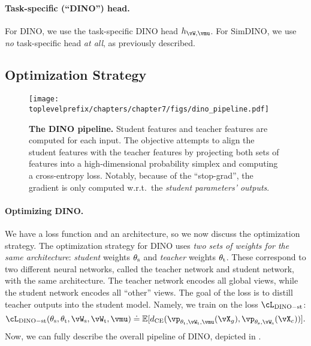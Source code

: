 \documentclass[../../book-main.tex]{subfiles}
\begin{document}
\paragraph{Task-specific (``DINO'') head.} For DINO, we use the task-specific DINO head \(h_{\vW, \vmu}\). For SimDINO, we use \textit{no} task-specific head \textit{at all}, as previously described.

\subsection{Optimization Strategy}\label{sub:contrastive_learning_optimization}

\begin{figure}
    \centering 
    \texttt{[image: \\toplevelprefix/chapters/chapter7/figs/dino\_pipeline.pdf]}
    \caption{\small \textbf{The DINO pipeline.} Student features and teacher features are computed for each input. The objective attempts to align the student features with the teacher features by projecting both sets of features into a high-dimensional probability simplex and computing a cross-entropy loss. Notably, because of the ``stop-grad'', the gradient is only computed w.r.t.~the \textit{student parameters' outputs}.}
    \label{fig:dino_pipeline}
\end{figure}

\paragraph{Optimizing DINO.} We have a loss function and an architecture, so we now discuss the optimization strategy. The optimization strategy for DINO uses \textit{two sets of weights for the same architecture}: \textit{student} weights \(\theta_{\mathrm{s}}\) and \textit{teacher} weights \(\theta_{\mathrm{t}}\). These correspond to two different neural networks, called the teacher network and student network, with the same architecture. The teacher network encodes all global views, while the student network encodes all ``other'' views. The goal of the loss is to distill teacher outputs into the student model. Namely, we train on the loss \(\cL_{\dino{}-\student\teacher}\):
\begin{equation}\label{eq:dino_loss_teacherstudent}
    \cL_{\dino{}-\student\teacher}(\theta_{\student}, \theta_{\teacher}, \vW_{\student}, \vW_{\teacher}, \vmu) \doteq \Ex[d_{\CE}(\vp_{\theta_{\teacher}, \vW_{\teacher}, \vmu}(\vX_{g}), \vp_{\theta_{\student}, \vW_{\student}}(\vX_{c}))].
\end{equation}
Now, we can fully describe the overall pipeline of DINO, depicted in .
\end{document}
